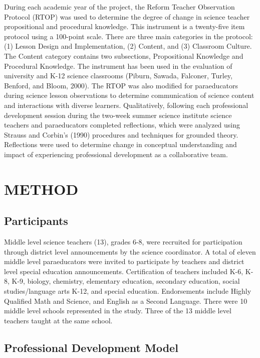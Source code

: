 \documentclass[11.5pt]{sig-alternate} %
\begin{document}
\begin{large}
During each academic year of the project, the Reform Teacher Observation Protocol (RTOP) was used to determine the degree of change in science teacher propositional and procedural knowledge. This instrument is a twenty-five item protocol using a 100-point scale. There are three main categories in the protocol: (1) Lesson Design and Implementation, (2) Content, and (3) Classroom Culture. The Content category contains two subsections, Propositional Knowledge and Procedural Knowledge. The instrument has been used in the evaluation of university and K-12 science classrooms (Piburn, Sawada, Falconer, Turley, Benford, and Bloom, 2000). The RTOP was also modified for paraeducators during science lesson observations to determine communication of science content and interactions with diverse learners. Qualitatively, following each professional development session during the two-week summer science institute science teachers and paraeducators completed reflections, which were analyzed using Strauss and Corbin’s (1990) procedures and techniques for grounded theory. Reflections were used to determine change in conceptual understanding and impact of experiencing professional development as a collaborative team.

\section*{METHOD}

\subsection*{Participants}

Middle level science teachers (13), grades 6-8, were recruited for participation through district level announcements by the science coordinator. A total of eleven middle level paraeducators were invited to participate by teachers and district level special education announcements. Certification of teachers included K-6, K-8, K-9, biology, chemistry, elementary education, secondary education, social studies/language arts K-12, and special education. Endorsements include Highly Qualified Math and Science, and English as a Second Language. There were 10 middle level schools represented in the study. Three of the 13 middle level teachers taught at the same school.

\subsection*{Professional Development Model}


\end{large}
\end{document}
